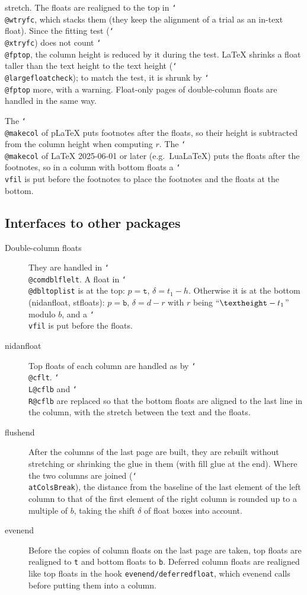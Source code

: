 \documentclass[paper=a4,dvipdfmx]{jlreq}
\newcommand\pkg[1]{\textsf{#1}}
\newcommand\opt[1]{\texttt{#1}}
\newcommand\cs[1]{\texttt{\char`\\#1}}
\begin{document}
\begin{description}
  stretch. The floats are realigned to the top in \cs{@wtryfc}, which stacks
  them (they keep the alignment of a trial as an in-text float). Since the fitting
  test (\cs{@xtryfc}) does not count \cs{@fptop}, the column height is reduced by
  it during the test. \LaTeX{} shrinks a float taller than the text height to the
  text height (\cs{@largefloatcheck}); to match the test, it is shrunk by
  \cs{@fptop} more, with a warning. Float-only pages of double-column floats are
  handled in the same way.
\item[Order of footnotes] The \cs{@makecol} of pLaTeX puts footnotes after the
  floats, so their height is subtracted from the column height when computing
  $r$. The \cs{@makecol} of \LaTeX{} 2025-06-01 or later (e.g.\ LuaLaTeX) puts the
  floats after the footnotes, so in a column with bottom floats a \cs{vfil} is put
  before the footnotes to place the footnotes and the floats at the bottom.
\end{description}

\subsection{Interfaces to other packages}

\begin{description}
\item[Double-column floats] They are handled in \cs{@comdblflelt}. A float in
  \cs{@dbltoplist} is at the top: $p=\opt{t}$, $\delta=t_1-h$. Otherwise it is at
  the bottom
  (\pkg{nidanfloat}, \pkg{stfloats}): $p=\opt{b}$, $\delta=d-r$ with $r$ being
  ``$\cs{textheight}-t_1$'' modulo $b$, and a \cs{vfil} is put before the
  floats.
\item[\pkg{nidanfloat}] Top floats of each column are handled as by \cs{@cflt}.
  \cs{L@cflb} and \cs{R@cflb} are replaced so that the bottom floats are aligned to
  the last line in the column, with the stretch between the text and the floats.
\item[\pkg{flushend}] After the columns of the last page are built, they are
  rebuilt without stretching or shrinking the glue in them (with fill glue at the
  end). Where the two columns are joined (\cs{atColsBreak}), the distance from
  the baseline of the last element of the left column to that of the first
  element of the right column is rounded up to a multiple of $b$, taking the
  shift $\delta$ of float boxes into account.
\item[\pkg{evenend}] Before the copies of column floats on the last page are
  taken, top floats are realigned to \opt{t} and bottom floats to \opt{b}.
  Deferred column floats are realigned like top floats in the hook
  \texttt{evenend/deferredfloat}, which evenend calls before putting them into a
  column.
\end{description}
\end{document}
